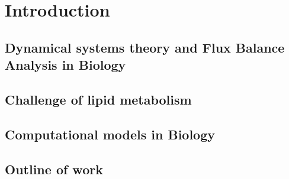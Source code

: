 
\chapter{Introduction}  %

\ifpdf
    \graphicspath{{Chapter1/Figs/Raster/}{Chapter1/Figs/PDF/}{Chapter1/Figs/}}
\else
    \graphicspath{{Chapter1/Figs/Vector/}{Chapter1/Figs/}}
\fi





\section{Dynamical systems theory and Flux Balance Analysis in
  Biology}


\section{Challenge of lipid metabolism}



\section{Computational models in Biology}


\section{Outline of work}